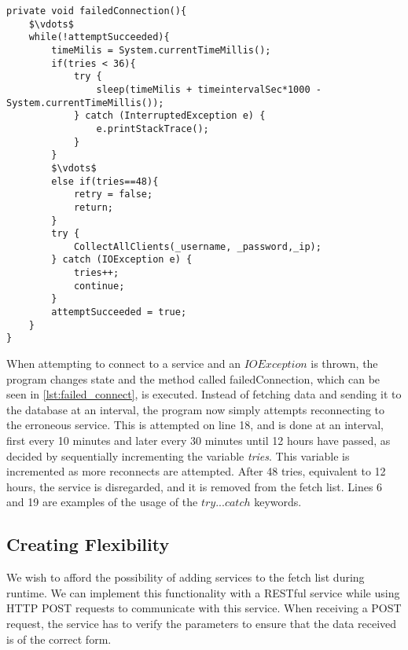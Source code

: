 \begin{lstlisting}[caption={Failed Connection snapshot},label={lst:failed_connect},language=inc_Java, mathescape]
private void failedConnection(){
	$\vdots$
    while(!attemptSucceeded){
        timeMilis = System.currentTimeMillis();
        if(tries < 36){
            try {
                sleep(timeMilis + timeintervalSec*1000 - System.currentTimeMillis());
            } catch (InterruptedException e) {
                e.printStackTrace();
            }
        }
        $\vdots$
        else if(tries==48){
        	retry = false;
            return;
        }
        try {
            CollectAllClients(_username, _password,_ip);
        } catch (IOException e) {
            tries++;
            continue;
        }
        attemptSucceeded = true;
    }
}
\end{lstlisting}

When attempting to connect to a service and an $IOException$ is thrown, the program changes state and the method called failedConnection, which can be seen in \cref{lst:failed_connect}, is executed. Instead of fetching data and sending it to the database at an interval, the program now simply attempts reconnecting to the erroneous service. This is attempted on line 18, and is done at an interval, first every 10 minutes and later every 30 minutes until 12 hours have passed, as decided by sequentially incrementing the variable \emph{tries}. This variable is incremented as more reconnects are attempted. After 48 tries, equivalent to 12 hours, the service is disregarded, and it is removed from the fetch list. Lines 6 and 19 are examples of the usage of the $try...catch$ keywords.

\subsection{Creating Flexibility}
We wish to afford the possibility of adding services to the fetch list during runtime. We can implement this functionality with a RESTful service while using HTTP POST requests to communicate with this service. When receiving a POST request, the service has to verify the parameters to ensure that the data received is of the correct form. 

